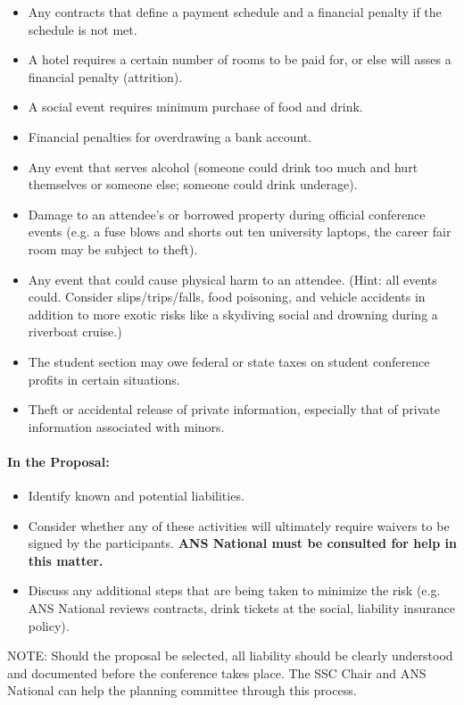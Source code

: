 \documentclass[12pt]{article}
\begin{document}
\begin{itemize}
\item{Any contracts that define a payment schedule and a financial penalty if the schedule is not met.}
\item{A hotel requires a certain number of rooms to be paid for, or else will asses a financial penalty (attrition).}
\item{A social event requires minimum purchase of food and drink.}
\item{Financial penalties for overdrawing a bank account.}
\item{Any event that serves alcohol (someone could drink too much and hurt themselves or someone else; someone could drink underage).}
\item{Damage to an attendee's or borrowed property during official conference events (e.g. a fuse blows and shorts out ten university laptops, the career fair room may be subject to theft).}
\item{Any event that could cause physical harm to an attendee. (Hint: all events could. Consider slips/trips/falls, food  poisoning, and vehicle accidents in addition to more exotic risks like a skydiving social and drowning during a riverboat cruise.)}
\item{The student section may owe federal or state taxes on student conference profits in certain situations.}
\item{Theft or accidental release of private information, especially that of private information associated with minors.}
\end{itemize}


\paragraph{In the Proposal:}
\begin{itemize}
\item{Identify known and potential liabilities.}
\item{Consider whether any of these activities will ultimately require waivers to be signed by the participants. \textbf{ANS National must be consulted for help in this matter.}}
\item{Discuss any additional steps that are being taken to minimize the risk (e.g. ANS National reviews contracts, drink tickets at the social, liability insurance policy).}
\end{itemize}

NOTE: Should the proposal be selected, all liability should be clearly understood and documented before the conference takes place. The SSC Chair and ANS National can help the planning committee through this process.
\end{document}

